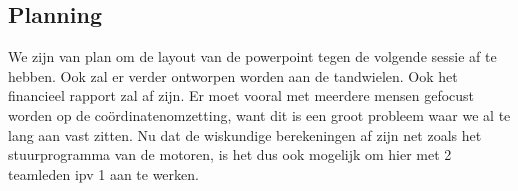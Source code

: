 \documentclass{kulakarticle}
\begin{document}
	\subsection{Planning}
	We zijn  van plan om de layout van de powerpoint tegen de volgende sessie af te hebben. Ook zal er verder ontworpen worden aan de tandwielen. Ook het financieel rapport zal af zijn. Er moet vooral met meerdere mensen gefocust worden op de coördinatenomzetting, want dit is een groot probleem waar we al te lang aan vast zitten. Nu dat de wiskundige berekeningen af zijn net zoals het stuurprogramma van de motoren, is het dus ook mogelijk om hier met 2 teamleden ipv 1 aan te werken. 
	
\end{document}
